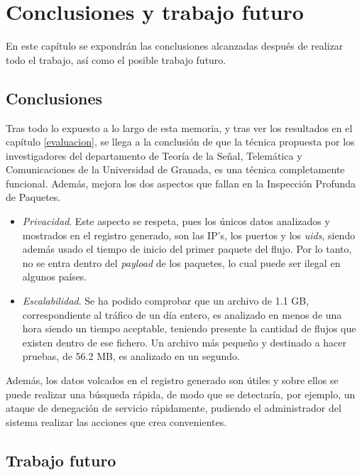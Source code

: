 \chapter{Conclusiones y trabajo futuro}\label{conclusiones}

En este capítulo se expondrán las conclusiones alcanzadas después de realizar todo el trabajo, así como el posible trabajo futuro.

\section{Conclusiones}

Tras todo lo expuesto a lo largo de esta memoria, y tras ver los resultados en el capítulo \ref{evaluacion}, se llega a la conclusión 
de que la técnica propuesta por los investigadores del departamento de Teoría de la Señal, Telemática y Comunicaciones de la 
Universidad de Granada, es una técnica completamente funcional. Además, mejora los dos aspectos que fallan en la Inspección Profunda 
de Paquetes.

\begin{itemize}
\item \textit{Privacidad}. Este aspecto se respeta, pues los únicos datos analizados y mostrados en el registro generado, son las 
IP's, los puertos y los \textit{uids}, siendo además usado el tiempo de inicio del primer paquete del flujo. Por lo tanto, no se entra 
dentro del \textit{payload} de los paquetes, lo cual puede ser ilegal en algunos países.

\item \textit{Escalabilidad}. Se ha podido comprobar que un archivo de 1.1 GB, correspondiente al tráfico de un día entero, es 
analizado en menos de una hora siendo un tiempo aceptable, teniendo presente la cantidad de flujos que existen dentro de ese fichero. 
Un archivo más pequeño y destinado a hacer pruebas, de 56.2 MB, es analizado en un segundo.
\end{itemize}

\intro Además, los datos volcados en el registro generado son útiles y sobre ellos se puede realizar una búsqueda rápida, de modo que 
se detectaría, por ejemplo, un ataque de denegación de servicio rápidamente, pudiendo el administrador del sistema realizar las 
acciones que crea convenientes.

\section{Trabajo futuro}

